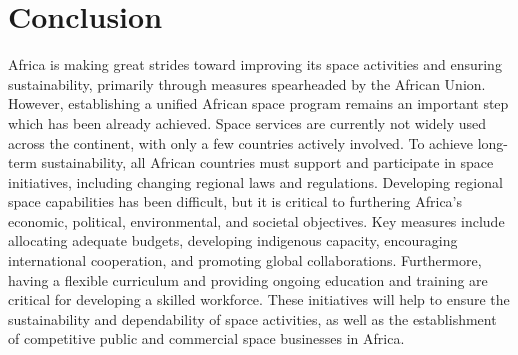 \documentclass[final,5p,times, twocolumn, sort&compress, sc]{elsarticle}
\begin{document}
\section{Conclusion}
Africa is making great strides toward improving its space activities and ensuring sustainability, primarily through measures spearheaded by the African Union. However, establishing a unified African space program remains an important step which has been already achieved. Space services are currently not widely used across the continent, with only a few countries actively involved. To achieve long-term sustainability, all African countries must support and participate in space initiatives, including changing regional laws and regulations. Developing regional space capabilities has been difficult, but it is critical to furthering Africa's economic, political, environmental, and societal objectives. Key measures include allocating adequate budgets, developing indigenous capacity, encouraging international cooperation, and promoting global collaborations. Furthermore, having a flexible curriculum and providing ongoing education and training are critical for developing a skilled workforce.  These initiatives will help to ensure the sustainability and dependability of space activities, as well as the establishment of competitive public and commercial space businesses in Africa.

 

\end{document}
